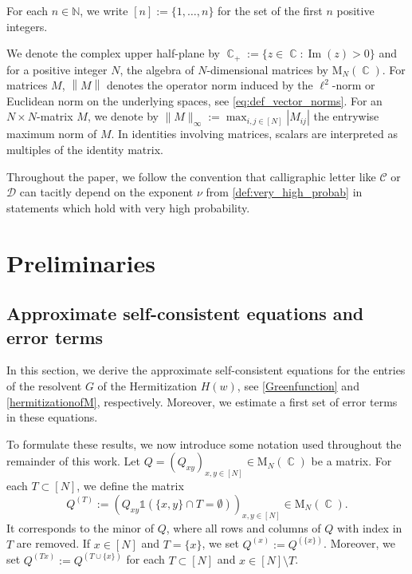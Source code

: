 \documentclass[11pt]{article}
\DeclareMathOperator{\Ima}{Im}
\DeclareMathOperator{\CC}{\mathbb{C}}
\newcommand{\norm}[1]{\left\| #1 \right\|}
\newcommand{\N}{\mathbb{N}}
\theoremstyle{plain}
\theoremstyle{remark}
\numberwithin{equation}{section}
\begin{document}
	For each $n \in \N$, we write $[n] := \{1, \ldots, n\}$ for the set of the first $n$ positive integers. 
	
	

	
	We denote the complex upper half-plane by $\CC_+ := \{ z \in \CC\colon \Ima(z)>0\}$ and for a positive integer $N$, 
the algebra of $N$-dimensional matrices by $\mathrm{M}_N (\CC)$. For matrices $M$, 
	$\norm{M}$ denotes the operator norm induced by the $\ell^2$-norm or Euclidean norm on the underlying spaces, see \cref{eq:def_vector_norms}. 
	For an $N\times N$-matrix $M$, we denote by $\|M\|_{\infty}:= \max_{i,j \in [N]} |M_{ij}|$ the entrywise maximum norm of $M$. 
	In identities involving matrices, scalars are interpreted as multiples of the identity matrix. 

	Throughout the paper, we follow the convention that calligraphic letter like $\mathcal C$ or $\mathcal D$ can tacitly depend on the exponent $\nu$ from \cref{def:very_high_probab} in statements which hold with very high probability. 


\section{Preliminaries} 

	\subsection{Approximate self-consistent equations and error terms}\label{subsection:Approx_sc_eq} 
	
	In this section, we derive the approximate self-consistent equations for the entries of the resolvent $G$ of the Hermitization $H(w)$, see \cref{Greenfunction} and \cref{hermitizationofM}, respectively. Moreover, we estimate a first set of error terms in these equations. 
	
	To formulate these results, we now introduce some notation used throughout the remainder of this work. 
	Let $Q=(Q_{xy})_{x,y \in [N]} \in \mathrm{M}_N(\CC)$ be a matrix. For each $T \subset [N]$, we define the matrix 
	\begin{equation}\label{eq:def_M_(_T_)} 
		Q^{(T)}:= (Q_{xy}\mathds{1}\left(\{x,y\} \cap T = \emptyset\right))_{x,y\in [N]} \in \mathrm{M}_{N}(\CC). 
	\end{equation}
	It corresponds to the minor of $Q$, where all rows and columns of $Q$ with index in $T$ are removed. 
	If $x \in [N]$ and $T= \{x\}$, we set $Q^{(x)} := Q^{(\{x\})}$. Moreover,  we set $Q^{(Tx)}:=Q^{(T\cup \{x\})}$ for each $T \subset [N]$ and $x \in [N] \setminus T$.
	
\end{document}

